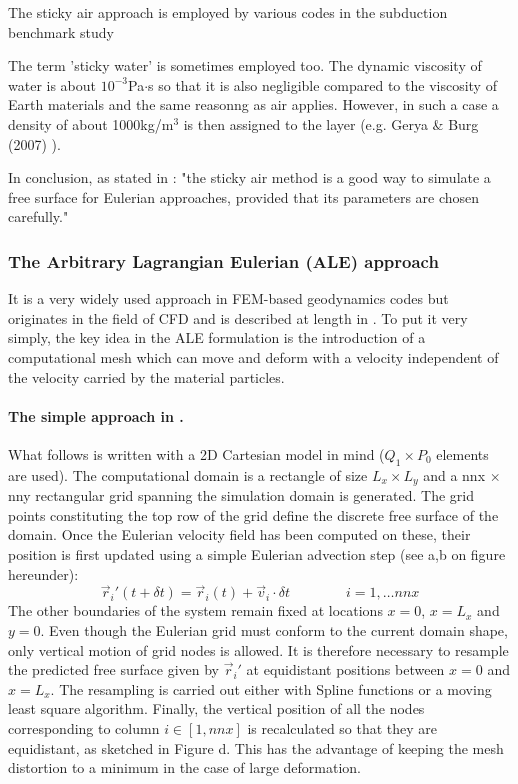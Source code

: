 The sticky air approach is employed by various codes in the subduction benchmark study \cite{scbe08}

The term 'sticky water' is sometimes employed too. The dynamic viscosity of water is about 
$10^{-3}$Pa$\cdot$s so that it is also negligible compared to the viscosity of Earth materials
and the same reasonng as air applies. However, in such a case a density of about 1000kg/m$^3$ 
is then assigned to the layer (e.g. Gerya \& Burg (2007) \cite{gebu07}).

In conclusion, as stated in \cite{crsg12}: "the sticky air method is a good way to
simulate a free surface for Eulerian approaches, provided that its
parameters are chosen carefully."


\subsubsection{The Arbitrary Lagrangian Eulerian (ALE) approach}\label{sss:ale}
 

It is a very widely used approach in FEM-based geodynamics codes but originates in the field of 
CFD \cite{hiac74,hulz81} and is described at length in \cite{sozo01,dohp04,dohu03}.
To put it very simply, the key idea in the ALE formulation is
the introduction of a computational mesh which can move and deform with a velocity 
independent of the velocity carried by the material particles.

\paragraph{The simple approach in \cite{thie11}.}
What follows is written with a 2D Cartesian model in mind ($Q_1\times P_0$ elements are used).
The computational domain is a rectangle of size $L_x \times  L_y$ 
and a nnx $\times$ nny rectangular grid spanning the simulation
domain is generated.
The grid points constituting the top row of the grid define the
discrete free surface of the domain. Once the Eulerian velocity field
has been computed on these, their position is first updated using a
simple Eulerian advection step (see a,b on figure hereunder):
\[
\vec{r}_i'(t+\delta t) = \vec{r}_i(t) + \vec{v}_i \cdot \delta t
\qquad\qquad
i=1,\dots nnx
\]
The other boundaries of the system remain fixed at locations
$x=0$, $x=L_x$ and $y=0$. Even though the Eulerian grid must conform
to the current domain shape, only vertical motion of grid nodes is
allowed. It is therefore necessary to resample the predicted free
surface given by $\vec{r}_i'$ at equidistant positions between $x=0$ and $x=L_x$.
The resampling is carried out either with Spline functions or a 
moving least square algorithm. 
Finally, the vertical position of all the nodes corresponding
to column $i\in [1,nnx]$ is recalculated so that they are equidistant, 
as sketched in Figure d. This has the advantage of keeping
the mesh distortion to a minimum in the case of large
deformation.

